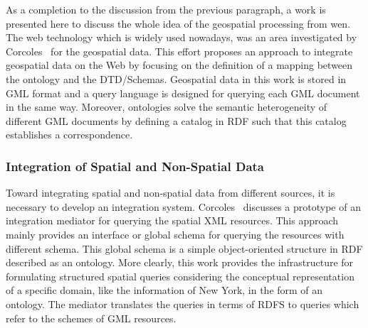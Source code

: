 \documentclass[a4paper,12pt]{article}
\begin{document}
As a completion to the discussion from the previous paragraph, a work is presented here to 
discuss the whole idea of the geospatial processing from wen.
The web technology which is widely used nowadays, 
was an area investigated by Corcoles~\cite{corcoles2003} for the geospatial data. 
This effort proposes an approach to integrate geospatial data on the Web by focusing on the definition of a mapping between the ontology and the DTD/Schemas. 
Geospatial data in this work is stored in GML format and a query language is designed for querying each GML document in the same way. 
Moreover, ontologies solve the semantic heterogeneity of different GML documents 
by defining a catalog in RDF such that this catalog establishes a correspondence.

\subsubsection{Integration of Spatial and Non-Spatial Data}
\label{integration}
Toward integrating spatial and non-spatial data from different sources, 
it is necessary to develop an integration system. 
Corcoles~\cite{corcoles2003} discusses a prototype of an integration mediator for querying the spatial XML resources. 
This approach mainly provides an interface or global schema for querying the resources with different schema. 
This global schema is a simple object-oriented structure in RDF described as an ontology. 
More clearly, this work provides the infrastructure for formulating structured spatial queries 
considering the conceptual representation of a specific domain, like the information of New York, 
in the form of an ontology. The mediator translates the queries in terms of RDFS to queries which refer to the schemes of GML resources.
\end{document}
